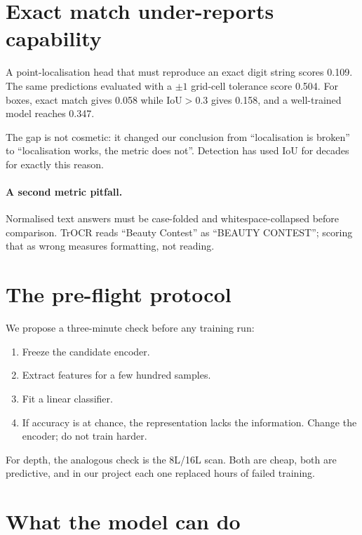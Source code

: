 \documentclass[10pt,twocolumn,letterpaper]{article}
\begin{document}
\section{Exact match under-reports capability}
\label{sec:metric}

A point-localisation head that must reproduce an exact digit string scores
0.109. The same predictions evaluated with a $\pm1$ grid-cell tolerance score
0.504. For boxes, exact match gives 0.058 while IoU$>0.3$ gives 0.158, and a
well-trained model reaches 0.347.

The gap is not cosmetic: it changed our conclusion from ``localisation is
broken'' to ``localisation works, the metric does not''. Detection has used
IoU for decades for exactly this reason.

\paragraph{A second metric pitfall.} Normalised text answers must be
case-folded and whitespace-collapsed before comparison. TrOCR reads
``Beauty Contest'' as ``BEAUTY CONTEST''; scoring that as wrong measures
formatting, not reading.

\section{The pre-flight protocol}
\label{sec:protocol}

We propose a three-minute check before any training run:

\begin{enumerate}[leftmargin=1.2em,itemsep=2pt,topsep=2pt]
\item Freeze the candidate encoder.
\item Extract features for a few hundred samples.
\item Fit a linear classifier.
\item If accuracy is at chance, the representation lacks the information.
      Change the encoder; do not train harder.
\end{enumerate}

For depth, the analogous check is the 8L/16L scan. Both are cheap, both are
predictive, and in our project each one replaced hours of failed training.

\section{What the model can do}
\end{document}
